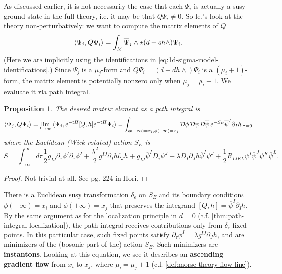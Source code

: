 \documentclass{report}
\theoremstyle{plain}
\newtheorem{proposition}[theorem]{Proposition}
\theoremstyle{definition}
\theoremstyle{remark}
\newcommand{\di}{\partial}
\newcommand{\cD}{\mathcal{D}}
\newcommand{\cnj}{\overline}
\begin{document}
As discussed earlier, it is not necessarily the case that each
$\Psi_i$ is actually a susy ground state in the full theory, i.e. it
may be that $Q \Psi_i \neq 0$. So let's look at the theory
non-perturbatively: we want to compute the matrix elements of $Q$
\[ \braket{\Psi_j, Q\Psi_i} = \int_M \cnj\Psi_j \wedge \star(d + dh \wedge) \Psi_i. \]
(Here we are implicitly using the identifications in
\ref{eq:1d-sigma-model-identifications}.) Since $\Psi_j$ is a
$\mu_j$-form and $Q\Psi_i = (d + dh \wedge)\Psi_i$ is a
$(\mu_i+1)$-form, the matrix element is potentially nonzero only when
$\mu_j = \mu_i+1$. We evaluate it via path integral.

\begin{proposition}
  The desired matrix element as a path integral is
  \[ \braket{\Psi_j, Q\Psi_i} = \lim_{t \to \infty} \braket{\Psi_j, e^{-tH}[Q, h]e^{-tH}\Psi_i} = \int_{\phi(-\infty)=x_i, \phi(+\infty)=x_j} \cD\phi \, \cD\psi\, \cD\cnj\psi \, e^{-S_E} \cnj\psi^I \di_I h|_{\tau=0} \]
  where the Euclidean (Wick-rotated) action $S_E$ is
  \[ S = \int_{-\infty}^\infty d\tau \, \frac{1}{2} g_{IJ} \di_\tau \phi^I \di_\tau \phi^J + \frac{\lambda^2}{2} g^{IJ} \di_Ih \di_Jh + g_{IJ}\cnj\psi^I D_\tau \psi^J + \lambda D_I \di_J h \cnj\psi^I\psi^J + \frac{1}{2} R_{IJKL} \psi^I\cnj\psi^J\psi^K\cnj\psi^L. \]
\end{proposition}

\begin{proof}
  Not trivial at all. See pg. 224 in Hori.
\end{proof}

There is a Euclidean susy transformation $\delta_\epsilon$ on $S_E$
and its boundary conditions $\phi(-\infty) = x_i$ and $\phi(+\infty) =
x_j$ that preserves the integrand $[Q, h] = \cnj\psi^I\di_Ih$. By the
same argument as for the localization principle in $d=0$ (c.f.
\ref{thm:path-integral-localization}), the path integral receives
contributions only from $\delta_\epsilon$-fixed points. In this
particular case, such fixed points satisfy $\di_\tau \phi^I = \lambda
g^{IJ} \di_J h$, and are minimizers of the (bosonic part of the)
action $S_E$. Such minimizers are {\bf instantons}. Looking at this
equation, we see it describes an {\bf ascending gradient flow} from
$x_i$ to $x_j$, where $\mu_i = \mu_j+1$ (c.f.
\ref{def:morse-theory-flow-line}).
\end{document}
